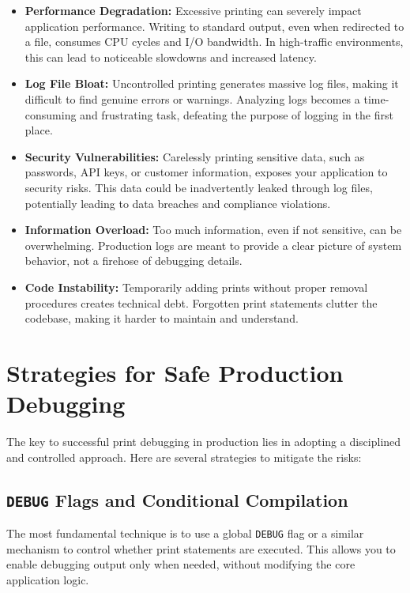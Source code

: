 \documentclass{article}
\begin{document}
\begin{itemize}
    \item \textbf{Performance Degradation:} Excessive printing can severely impact application performance. Writing to standard output, even when redirected to a file, consumes CPU cycles and I/O bandwidth. In high-traffic environments, this can lead to noticeable slowdowns and increased latency.
    \item \textbf{Log File Bloat:} Uncontrolled printing generates massive log files, making it difficult to find genuine errors or warnings. Analyzing logs becomes a time-consuming and frustrating task, defeating the purpose of logging in the first place.
    \item \textbf{Security Vulnerabilities:} Carelessly printing sensitive data, such as passwords, API keys, or customer information, exposes your application to security risks. This data could be inadvertently leaked through log files, potentially leading to data breaches and compliance violations.
    \item \textbf{Information Overload:} Too much information, even if not sensitive, can be overwhelming. Production logs are meant to provide a clear picture of system behavior, not a firehose of debugging details.
    \item \textbf{Code Instability:} Temporarily adding prints without proper removal procedures creates technical debt. Forgotten print statements clutter the codebase, making it harder to maintain and understand.
\end{itemize}

\section*{Strategies for Safe Production Debugging}

The key to successful print debugging in production lies in adopting a disciplined and controlled approach. Here are several strategies to mitigate the risks:

\subsection*{\texttt{DEBUG} Flags and Conditional Compilation}

The most fundamental technique is to use a global \texttt{DEBUG} flag or a similar mechanism to control whether print statements are executed. This allows you to enable debugging output only when needed, without modifying the core application logic.
\end{document}
